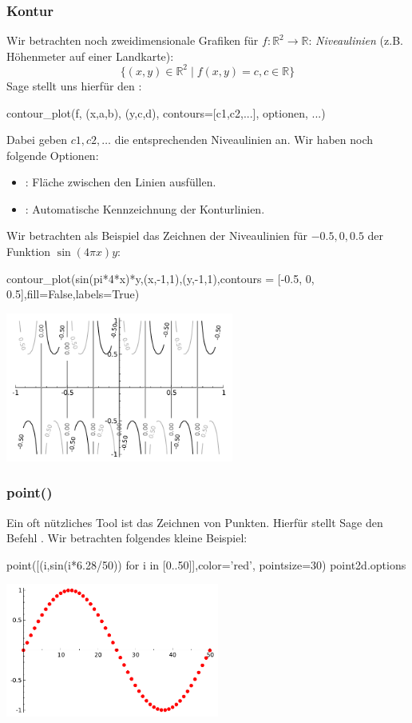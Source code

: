 \documentclass[fontsize=12pt,paper=a4,twoside,bibtotoc,idxtotoc,
liststotoc,pagesize,BCOR1.2cm,DIV15,chapterprefix,pagesize=pdftex]{scrbook}
\theoremstyle{plain}
\theoremstyle{definition}
\theoremstyle{remark}
\begin{document}
\subsubsection{Kontur}
Wir betrachten noch zweidimensionale Grafiken für $f:\mathbb{R}^2 \rightarrow \mathbb{R}$:
\emph{Niveaulinien} (z.B. Höhenmeter auf einer
Landkarte):
\[ 
\{(x,y) \in \mathbb{R}^2 \;|\; f(x,y)=c, c \in \mathbb{R}\}
\]
Sage stellt uns hierfür den :
\begin{sagein}
contour_plot(f, (x,a,b), (y,c,d), contours=[c1,c2,...], optionen, ...)
\end{sagein}
Dabei geben $c1,c2,\ldots$ die entsprechenden Niveaulinien an.
Wir haben noch folgende Optionen:
\begin{itemize}
 \item {}: Fläche zwischen den Linien ausfüllen.
 \item {}: Automatische Kennzeichnung der Konturlinien.
\end{itemize}

Wir betrachten als Beispiel das Zeichnen der Niveaulinien für $-0.5, 0, 0.5$ der Funktion $\sin(4\pi x)y$: 
\begin{sagein}
contour_plot(sin(pi*4*x)*y,(x,-1,1),(y,-1,1),contours = [-0.5, 0, 0.5],fill=False,labels=True)
\end{sagein}
\begin{center}
\includegraphics[width=7.5cm]{contour.pdf} 
\end{center}

\subsubsection{point()}
Ein oft nützliches Tool ist das Zeichnen von Punkten. Hierfür stellt Sage den Befehl {\color{blue} }. 
Wir betrachten folgendes kleine Beispiel:
\begin{sagein}
point([(i,sin(i*6.28/50)) for i in [0..50]],color='red', pointsize=30) 
point2d.options
\end{sagein}
\begin{center}
\includegraphics[width=7cm]{point2d.pdf} 
\end{center}
\end{document}
